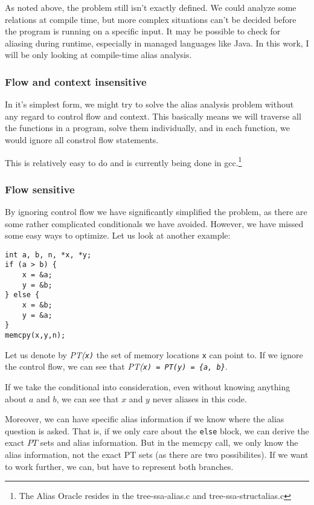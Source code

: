 As noted above, the problem still isn't exactly defined. We could analyze some
relations at compile time, but more complex situations can't be decided before
the program is running on a specific input. It may be possible to check for
aliasing during runtime, especially in managed languages like Java. In this
work, I will be only looking at compile-time alias analysis.

\subsubsection{Flow and context insensitive}

In it's simplest form, we might try to solve the alias analysis problem without
any regard to control flow and context. This basically means we will traverse
all the functions in a program, solve them individually, and in each function,
we would ignore all constrol flow statements.

This is relatively easy to do and is currently being done in gcc.\footnote{The
Alias Oracle resides in the tree-ssa-alias.c and tree-ssa-structalias.c}

\subsubsection{Flow sensitive}

By ignoring control flow we have significantly simplified the problem, as
there are some rather complicated conditionals we have avoided. However, we have
missed some easy ways to optimize. Let us look at another example:

\begin{verbatim}
int a, b, n, *x, *y;
if (a > b) {
    x = &a;
    y = &b;
} else {
    x = &b;
    y = &a;
}
memcpy(x,y,n);
\end{verbatim}

Let us denote by {\it PT(\tt x\it)} the set of memory locations {\tt x} can
point to. If we ignore the control flow, we can see that {\it PT(\tt x\it) = PT(\tt y\it)
= \{\tt a\it, \tt b\it\}}. 

If we take the conditional into consideration, even without knowing anything about
$a$ and $b$, we can see that $x$ and $y$ never aliases in this code.

Moreover, we can have specific alias information if we know where the alias
question is asked. That is, if we only care about the {\tt else} block, we can
derive the exact $PT$ sets and alias information. But in the memcpy call, we
only know the alias information, not the exact PT sets (as there are two
possibilites). If we want to work further, we can, but have to represent both
branches.

